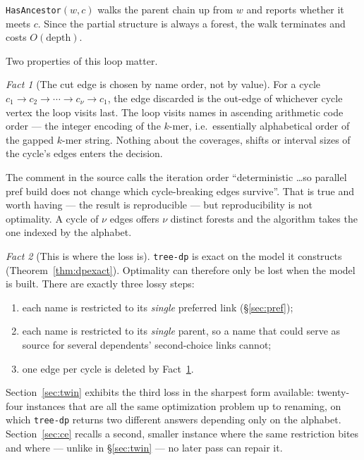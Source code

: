 \documentclass[11pt,a4paper]{article}
\theoremstyle{definition}
\theoremstyle{plain}
\theoremstyle{remark}
\newtheorem{fact}{Fact}
\begin{document}
\texttt{HasAncestor}$(w,c)$ walks the parent chain up from $w$ and
reports whether it meets $c$. Since the partial structure is always a
forest, the walk terminates and costs $O(\mathrm{depth})$.

Two properties of this loop matter.

\begin{fact}[The cut edge is chosen by name order, not by value]
\label{fact:order}
For a cycle $c_1 \to c_2 \to \cdots \to c_\nu \to c_1$, the edge
discarded is the out-edge of whichever cycle vertex the loop visits
last. The loop visits names in ascending arithmetic code order --- the
integer encoding of the $k$-mer, i.e.\ essentially alphabetical order of
the gapped $k$-mer string. Nothing about the coverages, shifts or
interval sizes of the cycle's edges enters the decision.
\end{fact}

The comment in the source calls the iteration order ``deterministic
\dots so parallel pref build does not change which cycle-breaking edges
survive''. That is true and worth having --- the result is reproducible
--- but reproducibility is not optimality. A cycle of $\nu$ edges offers
$\nu$ distinct forests and the algorithm takes the one indexed by the
alphabet.

\begin{fact}[This is where the loss is]
\label{fact:loss}
\texttt{tree-dp} is exact on the model it constructs
(Theorem~\ref{thm:dpexact}). Optimality can therefore only be lost when
the model is built. There are exactly three lossy steps:
\begin{enumerate}
\item each name is restricted to its \emph{single} preferred link
  (\S\ref{sec:pref});
\item each name is restricted to its \emph{single} parent, so a name
  that could serve as source for several dependents' second-choice
  links cannot;
\item one edge per cycle is deleted by Fact~\ref{fact:order}.
\end{enumerate}
\end{fact}

Section~\ref{sec:twin} exhibits the third loss in the sharpest form
available: twenty-four instances that are all the same optimization
problem up to renaming, on which \texttt{tree-dp} returns two different
answers depending only on the alphabet. Section~\ref{sec:ce} recalls a
second, smaller instance where the same restriction bites and where ---
unlike in \S\ref{sec:twin} --- no later pass can repair it.
\end{document}
